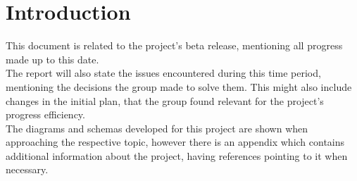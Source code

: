 %
%

\chapter{Introduction}

This document is related to the project's beta release, mentioning all progress made up to this date.\\

The report will also state the issues encountered during this time period, mentioning the 
decisions the group made to solve them. This might also include changes in the
initial plan, that the group found relevant for the project's progress efficiency.\\

The diagrams and schemas developed for this project are shown when approaching the respective topic,
however there is an appendix which contains additional information about the project, having 
references pointing to it when necessary.